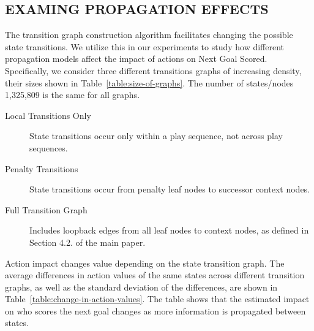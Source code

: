 \documentclass[]{article}
\begin{document}
\subsection{EXAMING PROPAGATION EFFECTS}
\label{subsec:lesion-study}


The transition graph construction algorithm facilitates changing the possible state transitions. We utilize this in our experiments to study how different propagation models affect the impact of actions on Next Goal Scored. Specifically, we consider three different transitions graphs of increasing density, their sizes shown in Table~\ref{table:size-of-graphs}. The number of states/nodes 1,325,809 is the same for all graphs.

\begin{description}
\item[Local Transitions Only]  State transitions occur only within a play sequence, not across play sequences.
\item[Penalty Transitions] State transitions occur from penalty leaf nodes to successor context nodes.
\item[Full Transition Graph] Includes loopback edges from all leaf nodes to context nodes, as defined in Section 4.2. of the main paper.
\end{description}

\begin{table}[htbp]
\caption{Size of State Transition Graphs}
\label{table:size-of-graphs}
\begin{center}
\end{center}
\end{table}


Action impact changes value depending on the state transition graph. The average differences in action values of the same states across different transition graphs, as well as the standard deviation of the differences, are shown in Table~\ref{table:change-in-action-values}. The table shows that the estimated impact on who scores the next goal changes as more information is propagated between states.
\end{document}
